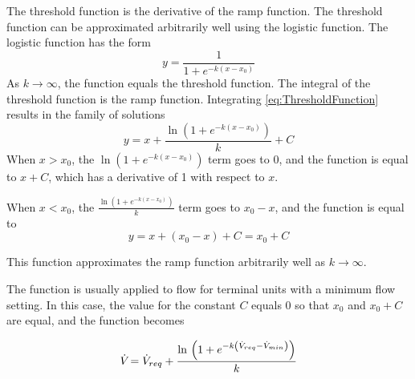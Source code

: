 The threshold function is the derivative of the ramp function. The
threshold function can be approximated arbitrarily well using the
logistic function. The logistic function has the form
\begin{equation}\label{eq:ThresholdFunction}
    y=\frac{1}{1+e^{-k\left(x-x_{0}\right)}}  
\end{equation}
As \(k\to\infty\), the function equals the threshold function. The
integral of the threshold function is the ramp function. Integrating 
 \ref{eq:ThresholdFunction} results in the family of solutions
\begin{equation}
    y=x+\frac{\ln \left(1+e^{-k\left(x-x_{0}\right)}\right) }{k} + C
\end{equation}
When \(x > x_{0}\), the \(\ln \left(1+e^{-k\left(x-x_{0}\right)}\right)
\) term goes to 0, and the function is equal to \(x+C\), which has a
derivative of 1 with respect to \(x\).

When \(x < x_{0}\), the \(\frac{\ln \left(1+e^{-k\left(x-x_{0}\right)}\right) }{k}\) term goes to \(x_{0} - x \), and the function is equal to 
\begin{equation}
    y = x + \left(x_{0} - x \right) + C = x_{0} + C
\end{equation}

This function approximates the ramp function arbitrarily well as
\(k\to\infty\). 

The function is usually applied to flow for terminal units with a
minimum flow setting. In this case, the value for the constant \(C\)
equals 0 so that \(x_{0}\) and \(x_{0}  +C \) are equal, and the function becomes

\begin{equation}
    \dot{V}_{} = \dot{V}_{req} + \frac{\ln{} \left(1+e^{-k\left( \dot{V}_{req} - \dot{V}_{min}
    \right)}\right)}{k} 
\end{equation}


